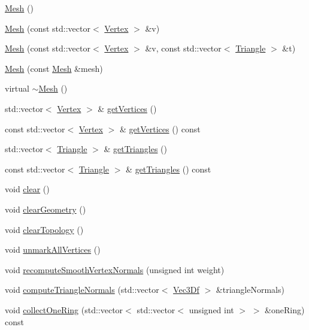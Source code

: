 \begin{DoxyCompactItemize}
\item 
\hyperlink{class_mesh_a2af137f1571af89172b9c102302c416b}{Mesh} ()
\item 
\hyperlink{class_mesh_adb9316d7dace57df26ff1fe78b8f8c0a}{Mesh} (const std::vector$<$ \hyperlink{class_vertex}{Vertex} $>$ \&v)
\item 
\hyperlink{class_mesh_a341fbc5393e30d8f391961e57d27f01f}{Mesh} (const std::vector$<$ \hyperlink{class_vertex}{Vertex} $>$ \&v, const std::vector$<$ \hyperlink{class_triangle}{Triangle} $>$ \&t)
\item 
\hyperlink{class_mesh_ad0260249329b621d4d91c66293baef8d}{Mesh} (const \hyperlink{class_mesh}{Mesh} \&mesh)
\item 
virtual \hyperlink{class_mesh_ad6a041191ed55c693254e945ce2869ff}{$\sim$Mesh} ()
\item 
std::vector$<$ \hyperlink{class_vertex}{Vertex} $>$ \& \hyperlink{class_mesh_a42f498162d3a1c2dc33673aaf0e13bbe}{getVertices} ()
\item 
const std::vector$<$ \hyperlink{class_vertex}{Vertex} $>$ \& \hyperlink{class_mesh_a012af8d734e4b24c9e4455460a309f39}{getVertices} () const 
\item 
std::vector$<$ \hyperlink{class_triangle}{Triangle} $>$ \& \hyperlink{class_mesh_ad8028e3925807b895700685d20d8d068}{getTriangles} ()
\item 
const std::vector$<$ \hyperlink{class_triangle}{Triangle} $>$ \& \hyperlink{class_mesh_a0ed54e18cd41d1464e9856870c0517af}{getTriangles} () const 
\item 
void \hyperlink{class_mesh_a7008e23cbaacd2878b7e81a01ac5d96b}{clear} ()
\item 
void \hyperlink{class_mesh_a1f53f5b1ea374096e87549bb34527627}{clearGeometry} ()
\item 
void \hyperlink{class_mesh_aa23a3186392b0285ff3cd5577a58a7eb}{clearTopology} ()
\item 
void \hyperlink{class_mesh_a5bf95f9557c71f7397b5d468e8c081e1}{unmarkAllVertices} ()
\item 
void \hyperlink{class_mesh_a9cb470310ac2300d068cace3b9ddf222}{recomputeSmoothVertexNormals} (unsigned int weight)
\item 
void \hyperlink{class_mesh_adb597894886af67deefb9abce6833c95}{computeTriangleNormals} (std::vector$<$ \hyperlink{class_vec3_d}{Vec3Df} $>$ \&triangleNormals)
\item 
void \hyperlink{class_mesh_ad615ce139902c658b6afa192e04e60a0}{collectOneRing} (std::vector$<$ std::vector$<$ unsigned int $>$ $>$ \&oneRing) const 

\end{DoxyCompactItemize}
